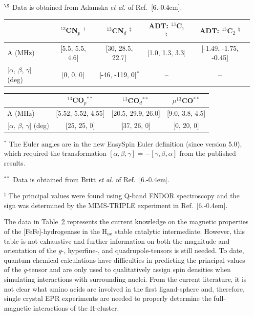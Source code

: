 \begin{table}[hb]
\begin{flushleft}
{$^{\S}$ Data is obtained from Adamska {\em et al.} of Ref.~[6.\kern-0.4em]. }\end{flushleft}

\begin{tabular}{l|c|c|c|c}
 & $^{13}$CN$_p$ $^\ddagger$ & $^{13}$CN$_d$ $^\ddagger$ & ADT: $^{13}$C$_1$ $^\natural$ & ADT: $^{13}$C$_2$ $^\natural$ \\ \hline \hline
A (MHz) & {[}5.5, 5.5, 4.6{]} & {[}30, 28.5, 22.7{]} & {[}1.0, 1.3, 3.3{]} & {[}-1.49, -1.75, -0.45{]} \\
{[}$\alpha$, $\beta$, $\gamma${]} (deg) & {[}0, 0, 0{]} & {[}-46, -119, 0{]}$^\ast$ & -- & -- \\
\end{tabular}
\newline
\vspace*{0.5em}
\newline
\begin{tabular}{l|c|c|c}
 & $^{13}$CO$_p$$^{\ast\ast}$ & $^{13}$CO$_d$$^{\ast\ast}$ & $\mu^{13}$CO$^{\ast\ast}$ \\ \hline \hline
A (MHz) & {[}5.52, 5.52, 4.55{]} &  {[}20.5, 29.9, 26.0{]} & {[}9.0, 3.8, 4.5{]}\\
{[}$\alpha$, $\beta$, $\gamma${]} (deg) &  {[}25, 25, 0{]} & {[}37, 26, 0{]} & {[}0, 20, 0{]} \\
\end{tabular}\label{table:eprthing}

\begin{flushleft}\footnotesize{
$^\ast$ The Euler angles are in the new EasySpin Euler definition (since version 5.0), which required the transformation $[\alpha,\beta,\gamma]= -[\gamma,\beta,\alpha]$ from the published results.

$^{\ast\ast}$ Data is obtained from Britt {\em et al.} of Ref.~[6.\kern-0.4em].

$^\natural$ The principal values were found using Q-band ENDOR spectroscopy and the sign was determined by the MIMS-TRIPLE experiment in Ref.~[6.\kern-0.4em].
} \end{flushleft}
\end{table}

The data in Table~\ref{table:eprthing} represents the current knowledge on the magnetic properties of the [FeFe]-hydrogenase in the H$_{ox}$ stable catalytic intermediate. However, this table is not exhaustive and further information on both the magnitude and orientation of the \textit{g}-, hyperfine-, and quadrupole-tensors is still needed. To date, quantum chemical calculations have difficulties in predicting the principal values of the \textit{g}-tensor\cite{GrecoDFT, FiedlerDFT} and are only used to qualitatively assign spin densities when simulating interactions with surrounding nuclei. From the current literature, it is not clear what amino acids are involved in the first ligand-sphere and, therefore, single crystal EPR experiments are needed to properly determine the full-magnetic interactions of the H-cluster. 

